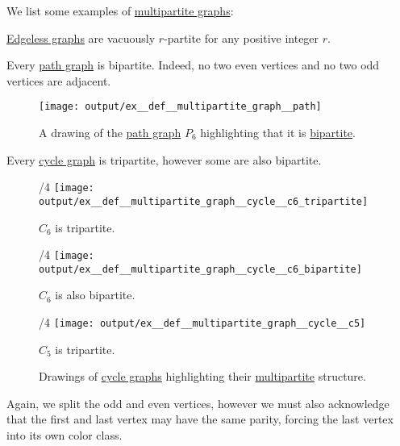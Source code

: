 \begin{example}\label{ex:def:multipartite_graph}
  We list some examples of \hyperref[def:multipartite_graph]{multipartite graphs}:
  \begin{thmenum}
     \hyperref[def:edgeless_graph]{Edgeless graphs} are vacuously \( r \)-partite for any positive integer \( r \).

     Every \hyperref[def:path_graph]{path graph} is bipartite. Indeed, no two even vertices and no two odd vertices are adjacent.
    \begin{figure}[!ht]
      \centering
      \texttt{[image: output/ex\_\_def\_\_multipartite\_graph\_\_path]}
      \caption{A drawing of the \hyperref[def:path_graph]{path graph} \( P_6 \) highlighting that it is \hyperref[def:multipartite_graph]{bipartite}.}\label{fig:ex:def:multipartite_graph/path}
    \end{figure}

     Every \hyperref[def:cycle_graph]{cycle graph} is tripartite, however some are also bipartite.

    \begin{figure}[!ht]
      \begin{subcaptionblock}{\textwidth/4}
        \centering
        \texttt{[image: output/ex\_\_def\_\_multipartite\_graph\_\_cycle\_\_c6\_tripartite]}
        \caption{\( C_6 \) is tripartite.}\label{fig:ex:def:multipartite_graph/cycle/c6_tripartite}
      \end{subcaptionblock}
      \hfill
      \begin{subcaptionblock}{\textwidth/4}
        \centering
        \texttt{[image: output/ex\_\_def\_\_multipartite\_graph\_\_cycle\_\_c6\_bipartite]}
        \caption{\( C_6 \) is also bipartite.}\label{fig:ex:def:multipartite_graph/cycle/c6_bipartite}
      \end{subcaptionblock}
      \hfill
      \begin{subcaptionblock}{\textwidth/4}
        \centering
        \texttt{[image: output/ex\_\_def\_\_multipartite\_graph\_\_cycle\_\_c5]}
        \caption{\( C_5 \) is tripartite.}\label{fig:ex:def:multipartite_graph/cycle/c5}
      \end{subcaptionblock}
      \caption{Drawings of \hyperref[def:cycle_graph]{cycle graphs} highlighting their \hyperref[def:multipartite_graph]{multipartite} structure.}\label{fig:ex:def:multipartite_graph/cycle}
    \end{figure}

    Again, we split the odd and even vertices, however we must also acknowledge that the first and last vertex may have the same parity, forcing the last vertex into its own color class.
  \end{thmenum}
\end{example}

